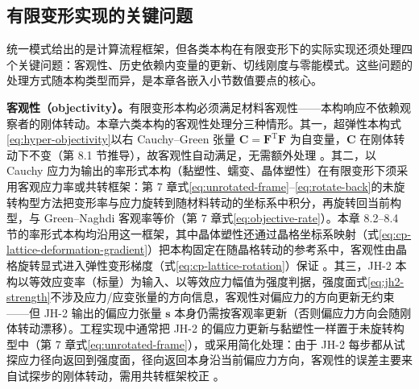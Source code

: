 \subsection{有限变形实现的关键问题}\label{sec:fd-key-issues}

统一模式给出的是计算流程框架，但各类本构在有限变形下的实际实现还须处理四个关键问题：客观性、历史依赖内变量的更新、切线刚度与零能模式。这些问题的处理方式随本构类型而异，是本章各嵌入小节数值要点的核心。

\textbf{客观性（objectivity）。}有限变形本构必须满足材料客观性——本构响应不依赖观察者的刚体转动。本章六类本构的客观性处理分三种情形。其一，超弹性本构式\eqref{eq:hyper-objectivity}以右 Cauchy--Green 张量 $\mathbf{C}=\mathbf{F}^{\mathrm{T}}\mathbf{F}$ 为自变量，$\mathbf{C}$ 在刚体转动下不变（第 8.1 节推导），故客观性自动满足，无需额外处理 \cite{Ogden1997}。其二，以 Cauchy 应力为输出的率形式本构（黏塑性、蠕变、晶体塑性）在有限变形下须采用客观应力率或共转框架：第 7 章式\eqref{eq:unrotated-frame}--\eqref{eq:rotate-back}的未旋转构型方法把变形率与应力旋转到随材料转动的坐标系中积分，再旋转回当前构型，与 Green--Naghdi 客观率等价（第 7 章式\eqref{eq:objective-rate}）\cite{Warren2009,FlanaganTaylor1987}。本章 8.2--8.4 节的率形式本构均沿用这一框架，其中晶体塑性还通过晶格坐标系映射（式\eqref{eq:cp-lattice-deformation-gradient}）把本构固定在随晶格转动的参考系中，客观性由晶格旋转显式进入弹性变形梯度（式\eqref{eq:cp-lattice-rotation}）保证 \cite{SunSundararaghavan2014}。其三，JH-2 本构以等效应变率（标量）为输入、以等效应力幅值为强度判据，强度面式\eqref{eq:jh2-strength}不涉及应力/应变张量的方向信息，客观性对偏应力的方向更新无约束——但 JH-2 输出的偏应力张量 $\mathbf{s}$ 本身仍需按客观率更新（否则偏应力方向会随刚体转动漂移）。工程实现中通常把 JH-2 的偏应力更新与黏塑性一样置于未旋转构型中（第 7 章式\eqref{eq:unrotated-frame}），或采用简化处理：由于 JH-2 每步都从试探应力径向返回到强度面，径向返回本身沿当前偏应力方向，客观性的误差主要来自试探步的刚体转动，需用共转框架校正 \cite{Lai2018}。

